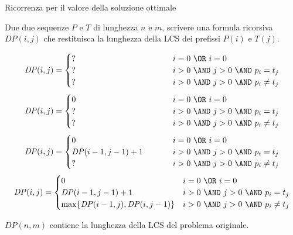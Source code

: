 \begin{frame}{Ricorrenza per il \alert{valore} della soluzione ottimale}

Due due sequenze $P$ e $T$ di lunghezza $n$ e $m$, scrivere una formula
ricorsiva $\mathit{DP}(i, j)$ che restituisca la \alert{lunghezza} della LCS dei prefissi $P(i)$ e $T(j)$.

\begingroup
\small
\begin{overprint}
\[
  \mathit{DP}(i,j) = \begin{cases}
   \makebox[4cm][l]{?} & i=0\ \OR\ i=0 \\
   \makebox[4cm][l]{?} & i>0\ \AND\ j>0\ \AND\ p_i = t_j \\
   \makebox[4cm][l]{?} & i>0\ \AND\ j>0\ \AND\ p_i \neq t_j
  \end{cases}
\]
\[
  \mathit{DP}(i,j) = \begin{cases}
   0 & i=0\ \OR\ i=0 \\
   \makebox[4cm][l]{?} & i>0\ \AND\ j>0\ \AND\ p_i = t_j \\
   \makebox[4cm][l]{?} & i>0\ \AND\ j>0\ \AND\ p_i \neq t_j
  \end{cases}
\]
\[
  \mathit{DP}(i,j) = \begin{cases}
   0 & i=0\ \OR\ i=0 \\
   \mathit{DP}(i-1,j-1)+1 & i>0\ \AND\ j>0\ \AND\ p_i = t_j \\
   \makebox[4cm][l]{?} & i>0\ \AND\ j>0\ \AND\ p_i \neq t_j
  \end{cases}
\]
\[
  \mathit{DP}(i,j) = \begin{cases}
   0 & i=0\ \OR\ i=0 \\
   \mathit{DP}(i-1,j-1)+1 & i>0\ \AND\ j>0\ \AND\ p_i = t_j \\
   \max \{ \mathit{DP}(i-1,j), \mathit{DP}(i,j-1) \} & i>0\ \AND\ j>0\ \AND\ p_i \neq t_j
  \end{cases}
\]
\end{overprint}
\endgroup

\bigskip
{}

\smallskip
$\mathit{DP}(n,m)$ contiene la lunghezza della LCS del problema originale.

\end{frame}

